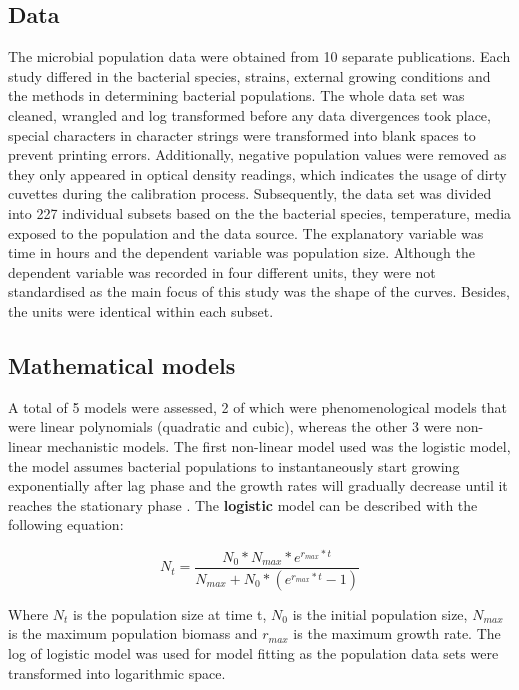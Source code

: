 \documentclass[11pt, a4paper]{article} %
\begin{document}
\subsection{Data}
The microbial population data were obtained from 10 separate publications. Each study differed in the bacterial species, strains, external growing conditions and the methods in determining bacterial populations. The whole data set was cleaned, wrangled and log transformed before any data divergences took place, special characters in character strings were transformed into blank spaces to prevent printing errors. Additionally, negative population values were removed as they only appeared in optical density readings, which indicates the usage of dirty cuvettes during the calibration process. Subsequently, the data set was divided into 227 individual subsets based on the the bacterial species, temperature, media exposed to the population and the data source. The explanatory variable was time in hours and the dependent variable was population size. Although the dependent variable was recorded in four different units, they were not standardised as the main focus of this study was the shape of the curves.  Besides, the units were identical within each subset.



\subsection{Mathematical models}
A total of 5 models were assessed, 2 of which were phenomenological models that were linear polynomials (quadratic and cubic), whereas the other 3 were non-linear mechanistic models. The first non-linear model used was the logistic model, the model assumes bacterial populations to instantaneously start growing exponentially after lag phase and the growth rates will gradually decrease until it reaches the stationary phase \cite{safuan2015mathematical}. The \textbf{logistic} model can be described with the following equation:

\begin{equation}
N_t = \frac{N_0 * N_{max} * e^{r_{max} * t}} {N_{max} + N_0 * (e^{r_{max} * t} - 1)}
\end{equation}

Where $N_t$ is the population size at time t, $N_0$ is the initial population size, $N_{max}$ is the maximum population biomass and $r_{max}$ is the maximum growth rate. The log of logistic model was used for model fitting as the population data sets were transformed into logarithmic space.\\
\end{document}
